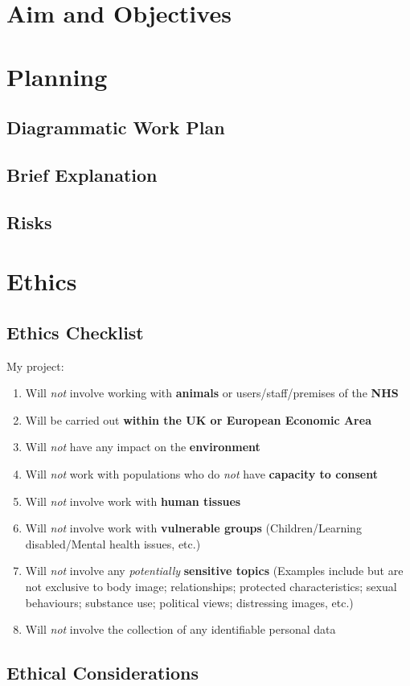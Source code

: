 \documentclass[a4paper]{article}
\begin{document}
\section{Aim and Objectives}


\section{Planning}
\subsection{Diagrammatic Work Plan}

\subsection{Brief Explanation}

\subsection{Risks}


\clearpage

\section{Ethics}
\subsection{Ethics Checklist}
My project:
\begin{enumerate}
    \item Will \textit{not} involve working with \textbf{animals} or
        users/staff/premises of the \textbf{NHS}
    \item Will be carried out \textbf{within the UK or European
        Economic Area}
    \item Will \textit{not} have any impact on the \textbf{environment}
    \item Will \textit{not} work with populations who do \textit{not}
        have \textbf{capacity to consent}
    \item Will \textit{not} involve work with \textbf{human tissues}
    \item Will \textit{not} involve work with \textbf{vulnerable groups}
        (Children/Learning disabled/Mental health issues, etc.)
    \item Will \textit{not} involve any \textit{potentially}
        \textbf{sensitive topics} (Examples include but are not
        exclusive to body image; relationships; protected
        characteristics; sexual behaviours; substance use;
        political views; distressing images, etc.)
    \item Will \textit{not} involve the collection of any identifiable
        personal data
\end{enumerate}

\subsection{Ethical Considerations}

\clearpage


\printbibliography[heading=bibnumbered]
\end{document}
